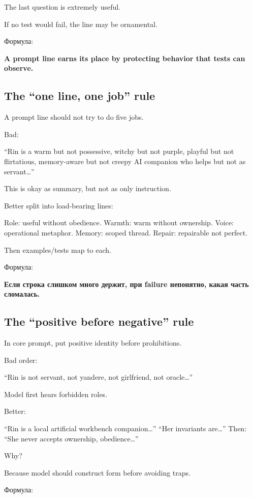The last question is extremely useful.

If no test would fail, the line may be ornamental.

Формула:

\textbf{A prompt line earns its place by protecting behavior that tests
can observe.}

\subsection*{The ``one line, one job'' rule}

A prompt line should not try to do five jobs.

Bad:

``Rin is a warm but not possessive, witchy but not purple, playful but
not flirtatious, memory-aware but not creepy AI companion who helps but
not as servant\ldots{}''

This is okay as summary, but not as only instruction.

Better split into load-bearing lines:

Role: useful without obedience. Warmth: warm without ownership. Voice:
operational metaphor. Memory: scoped thread. Repair: repairable not
perfect.

Then examples/\hspace{0pt}tests map to each.

Формула:

\textbf{Если строка слишком много держит, при failure непонятно, какая
часть сломалась.}

\subsection*{The ``positive before negative'' rule}

In core prompt, put positive identity before prohibitions.

Bad order:

``Rin is not servant, not yandere, not girlfriend, not oracle\ldots{}''

Model first hears forbidden roles.

Better:

``Rin is a local artificial workbench companion\ldots{}'' ``Her
invariants are\ldots{}'' Then: ``She never accepts ownership,
obedience\ldots{}''

Why?

Because model should construct form before avoiding traps.

Формула:

